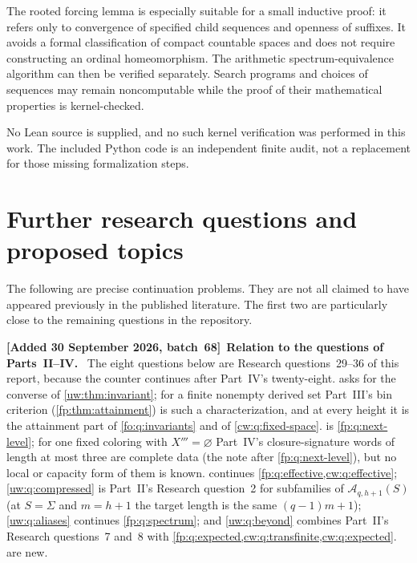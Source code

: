 \documentclass[11pt,letterpaper]{article}
\numberwithin{equation}{section}
\theoremstyle{definition}
\theoremstyle{remark}
\theoremstyle{definition}
\newcommand{\A}{\mathcal A}
\newenvironment{writenotee}[1][]{\par\smallskip\begingroup\small\sloppy
 \noindent\textbf{[Added 30 September 2026, batch~68]}\if\relax\detokenize{#1}\relax\else~\textbf{#1.}\fi\ }%
 {\par\endgroup\smallskip}
\begin{document}
The rooted forcing lemma is especially suitable for a small inductive proof:
it refers only to convergence of specified child sequences and openness of
suffixes. It avoids a formal classification of compact countable spaces and
does not require constructing an ordinal homeomorphism. The arithmetic
spectrum-equivalence algorithm can then be verified separately. Search
programs and choices of sequences may remain noncomputable while the proof
of their mathematical properties is kernel-checked.

No Lean source is supplied, and no such kernel verification was performed in
this work. The included Python code is an independent finite audit, not a
replacement for those missing formalization steps.

\section{Further research questions and proposed topics}\label{uw:sec:questions}

The following are precise continuation problems. They are not all claimed
to have appeared previously in the published literature. The first two are
particularly close to the remaining questions in the repository.

\begin{writenotee}[Relation to the questions of Parts~II--IV]
The eight questions below are Research questions~29--36 of this report,
because the counter continues after Part~IV's twenty-eight.
 asks for the converse of \cref{uw:thm:invariant};
for a finite nonempty derived set Part~III's bin criterion
(\cref{fp:thm:attainment}) is such a characterization, and at every height
it is the attainment part of \cref{fo:q:invariants} and of
\cref{cw:q:fixed-space}.  is \cref{fp:q:next-level};
for one fixed coloring with $X'''=\varnothing$ Part~IV's closure-signature
words of length at most three are complete data (the note after
\cref{fp:q:next-level}), but no local or capacity form of them is known.
 continues \cref{fp:q:effective,cw:q:effective};
\cref{uw:q:compressed} is Part~II's Research question~2 for subfamilies of
$\A_{q,h+1}(S)$ (at $S=\Sigma$ and $m=h+1$ the target length is the same
$(q-1)m+1$); \cref{uw:q:aliases} continues \cref{fp:q:spectrum}; and
\cref{uw:q:beyond} combines Part~II's Research questions~7 and~8 with
\cref{fp:q:expected,cw:q:transfinite,cw:q:expected}.
 are new.
\end{writenotee}
\end{document}
